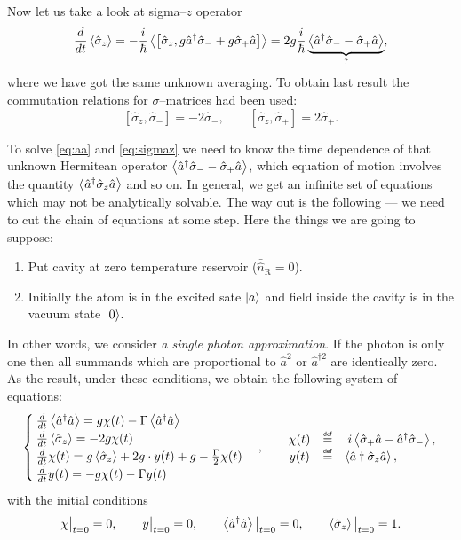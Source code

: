 Now let us take a look at sigma--$z$ operator
\begin{equation}
	\frac{d}{dt} \left\langle {\hat{\sigma}_z} \right\rangle = -\frac{i}{\hbar} \left\langle {\left[ \hat{\sigma}_z, g \hat{a}^{\dagger}\hat{\sigma}_- + g \hat{\sigma}_+ \hat{a} \right]} \right\rangle = 2 g\frac{i}{\hbar} \underbrace{\left\langle {\hat{a}^{\dagger}\hat{\sigma}_- - \hat{\sigma}_+ \hat{a}} \right\rangle}_{?},
	\label{eq:sigmaz}
\end{equation}
where we have got the same unknown averaging. To obtain last result the commutation relations for $\sigma$--matrices had been used:
\begin{equation}
	\left[ \hat{\sigma}_z, \hat{\sigma}_- \right] = - 2 \hat{\sigma}_-, \qquad
	\left[ \hat{\sigma}_z, \hat{\sigma}_+ \right] = 2 \hat{\sigma}_+.
\end{equation}

To solve \eqref{eq:aa} and \eqref{eq:sigmaz} we need to know the time dependence of that unknown Hermitean operator $\left\langle {\hat{a}^{\dagger}\hat{\sigma}_- - \hat{\sigma}_+ \hat{a}} \right\rangle$, which equation of motion involves the quantity $\left\langle {\hat{a}^{\dagger}\hat{\sigma}_z \hat{a}} \right\rangle$ and so on. In general, we get an infinite set of equations which may not be analytically solvable. The way out is the following --- we need to cut the chain of equations at some step. Here the things we are going to suppose:
\begin{enumerate}
	\item Put cavity at zero temperature reservoir ($\bar{\hat{n}}_{\text{R}} = 0$).
	\item Initially the atom is in the excited sate $\left\lvert {a} \right\rangle$ and field inside the cavity is in the vacuum state $\left\lvert {0} \right\rangle$.
\end{enumerate}
In other words, we consider \textit{a single photon approximation}. If the photon is only one then all summands which are proportional to $\hat{a}^2$ or $\hat{a}^{\dagger 2}$ are identically zero. As the result, under these conditions, we obtain the following system of equations:
\begin{equation}
	\begin{cases}
		\frac{d}{dt} \av{\hat{a}\dag \hat{a}} = g \chi(t) - \Gamma \av{\hat{a}\dag\hat{a}} \\
		\frac{d}{dt} \av{\hat{\sigma}_z} = - 2 g \chi(t) \\
		\frac{d}{dt} \chi(t) = g \av{\hat{\sigma}_z} + 2 g \cdot y(t) + g - \frac{\Gamma}{2} \chi(t) \\
		\frac{d}{dt} y(t) = - g \chi(t) - \Gamma y(t)
	\end{cases},
	\qquad 
	\begin{matrix}
		\chi(t) &\myeq& i \av{\hat{\sigma}_+ \hat{a} - \hat{a}\dag\hat{\sigma}_-}, \\
		y(t) &\myeq& \av{\hat{a}\dagger\hat{\sigma}_z \hat{a}}, \qquad \quad \ 
	\end{matrix}
\end{equation}
with the initial conditions 
\begin{equation}
	\chi \big|_{t=0} = 0, \qquad y \big|_{t=0} = 0, \qquad \left\langle {\hat{a}^{\dagger}\hat{a}} \right\rangle \big|_{t=0} = 0, \qquad \left\langle {\hat{\sigma}_z} \right\rangle \big|_{t=0} = 1. 
\end{equation}

